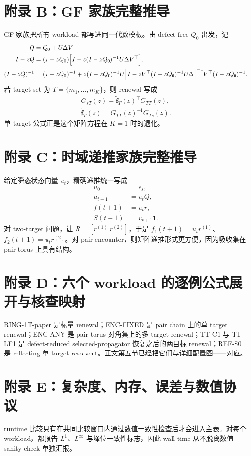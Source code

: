 \documentclass[11pt]{ctexart}
\newcommand{\TabDir}{../artifacts/tables}
\begin{document}
\section{附录 B：GF 家族完整推导}
GF 家族把所有 workload 都写进同一代数模板。由 defect-free $Q_0$ 出发，记
\begin{align}
Q &= Q_0 + U\Delta V^{\top},\\
I-zQ &= (I-zQ_0)\Bigl[I-z(I-zQ_0)^{-1}U\Delta V^{\top}\Bigr],\\
(I-zQ)^{-1} &= (I-zQ_0)^{-1} + z(I-zQ_0)^{-1}U\Bigl[I-zV^{\top}(I-zQ_0)^{-1}U\Delta\Bigr]^{-1}V^{\top}(I-zQ_0)^{-1}.
\end{align}
若 target set 为 $T=\{m_1,\dots,m_K\}$，则 renewal 写成
\begin{align}
G_{sT}(z)=\widetilde{\mathbf f}_T(z)^{\top}G_{TT}(z),\\
\widetilde{\mathbf f}_T(z)=G_{TT}(z)^{-1}G_{Ts}(z).
\end{align}
单 target 公式正是这个矩阵方程在 $K=1$ 时的退化。
\section{附录 C：时域递推家族完整推导}
给定瞬态状态向量 $u_t$，精确递推统一写成
\begin{align}
u_0 &= e_s,\\
u_{t+1} &= u_tQ,\\
f(t+1) &= u_tr,\\
S(t+1) &= u_{t+1}\mathbf 1.
\end{align}
对 two-target 问题，让 $R=[r^{(1)}\;r^{(2)}]$，于是 $f_1(t+1)=u_tr^{(1)}$、$f_2(t+1)=u_tr^{(2)}$。对 pair encounter，则矩阵递推形式更方便，因为吸收集在 pair torus 上具有结构。
\section{附录 D：六个 workload 的逐例公式展开与核查映射}
RING-1T-paper 是标量 renewal；ENC-FIXED 是 pair chain 上的单 target renewal；ENC-ANY 是 pair torus 对角集上的多 target renewal；TT-C1 与 TT-LF1 是 defect-reduced selected-propagator 恢复之后的两目标 renewal；REF-S0 是 reflecting 单 target resolvent。正文第五节已经把它们与详细配置图一一对应。
\begin{table}[H]
\centering\small
\resizebox{\linewidth}{!}{%

}
\caption{核查附录：逐 workload 列出实际 solver 配对、数学对象、论文来源与仓库实现锚点。}
\end{table}
\section{附录 E：复杂度、内存、误差与数值协议}
runtime 比较只有在共同比较窗口内通过数值一致性检查后才会进入主表。对每个 workload，都报告 $L^1$、$L^{\infty}$ 与峰位一致性标志，因此 wall time 从不脱离数值 sanity check 单独汇报。
\end{document}
